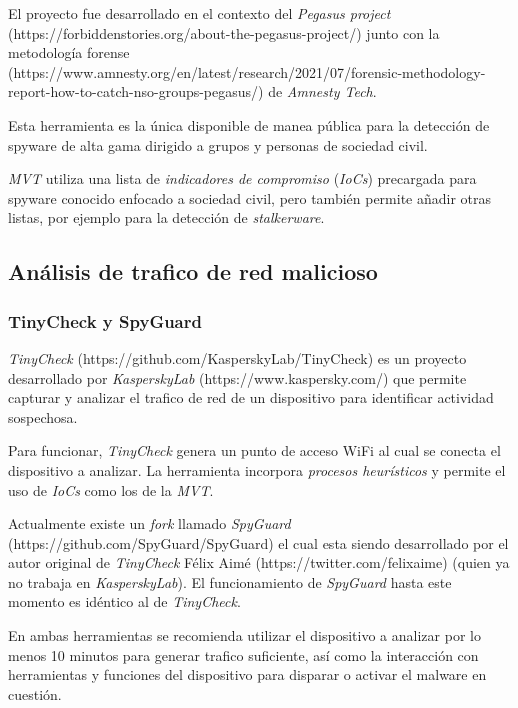 \documentclass[12pt]{caltech_thesis}
\begin{document}
El proyecto fue desarrollado en el contexto del \textit{Pegasus project} (https://forbiddenstories.org/about-the-pegasus-project/) junto con la metodología forense (https://www.amnesty.org/en/latest/research/2021/07/forensic-methodology-report-how-to-catch-nso-groups-pegasus/) de \textit{Amnesty Tech}.

Esta herramienta es la única disponible de manea pública para la detección de spyware de alta gama dirigido a grupos y personas de sociedad civil.

\textit{MVT} utiliza una lista de \textit{indicadores de compromiso} (\textit{IoCs}) precargada para spyware conocido enfocado a sociedad civil, pero también permite añadir otras listas, por ejemplo para la detección de \textit{stalkerware}.

\subsection{Análisis de trafico de red malicioso}

\subsubsection{TinyCheck y SpyGuard}

\textit{TinyCheck} (https://github.com/KasperskyLab/TinyCheck) es un proyecto desarrollado por \textit{KasperskyLab} (https://www.kaspersky.com/) que permite capturar y analizar el trafico de red de un dispositivo para identificar actividad sospechosa.

Para funcionar, \textit{TinyCheck} genera un punto de acceso WiFi al cual se conecta el dispositivo a analizar. La herramienta incorpora \textit{procesos heurísticos} y permite el uso de \textit{IoCs} como los de la \textit{MVT}.

Actualmente existe un \textit{fork} llamado \textit{SpyGuard} (https://github.com/SpyGuard/SpyGuard) el cual esta siendo desarrollado por el autor original de \textit{TinyCheck} Félix Aimé (https://twitter.com/felixaime) (quien ya no trabaja en \textit{KasperskyLab}). El funcionamiento de \textit{SpyGuard} hasta este momento es idéntico al de \textit{TinyCheck}.

En ambas herramientas se recomienda utilizar el dispositivo a analizar por lo menos 10 minutos para generar trafico suficiente, así como la interacción con herramientas y funciones del dispositivo para disparar o activar el malware en cuestión.
\end{document}
